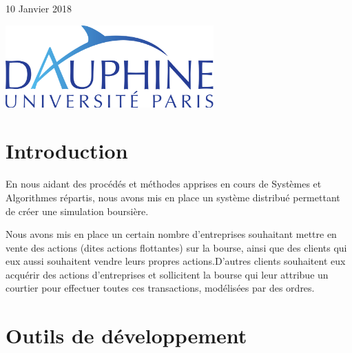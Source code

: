 \documentclass[11pt]{article}
\begin{document}
\begin{titlepage}
	
	
	\vfill\vfill 
	
	{\large10 Janvier 2018} 
	



	\leavevmode \newline 	\leavevmode \newline 	\leavevmode \newline 	\leavevmode \newline 	\leavevmode \newline 
	\includegraphics[width=0.6\textwidth]{dauphine.png}\\[1cm] 
	 

	

	
\end{titlepage}

\renewcommand{\thesection}{\Roman{section}}
\renewcommand{\thesubsection}{\thesection.\Roman{subsection}}





\section{Introduction}


En nous aidant des procédés et méthodes apprises en cours de Systèmes et Algorithmes répartis, nous avons mis en place un système distribué permettant de créer une simulation boursière.\newline 

Nous avons mis en place un certain nombre d’entreprises souhaitant mettre en vente des actions (dites actions flottantes) sur la bourse,  ainsi que des clients qui eux aussi souhaitent vendre leurs propres actions.\newline D’autres clients souhaitent eux acquérir des actions d’entreprises et sollicitent la bourse qui leur attribue un courtier pour effectuer toutes ces transactions, modélisées par des ordres.




\section{Outils de développement}
\end{document}
